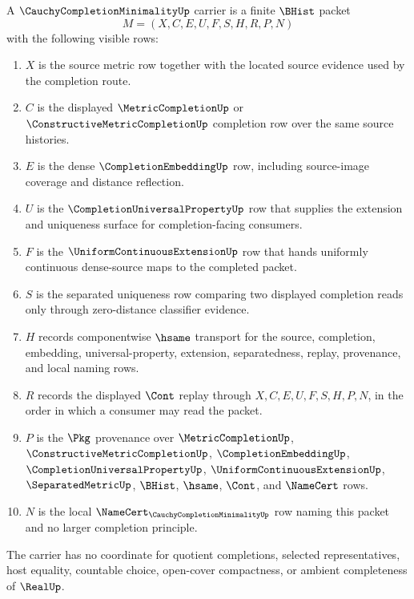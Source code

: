\begin{definition}
\label{def:cauchy-completion-minimality-carrier}
A $\CauchyCompletionMinimalityUp$ carrier is a finite $\BHist$ packet
$$
M=(X,C,E,U,F,S,H,R,P,N)
$$
with the following visible rows:
\begin{enumerate}
\item $X$ is the source metric row together with the located source evidence used by the completion route.
\item $C$ is the displayed $\MetricCompletionUp$ or $\ConstructiveMetricCompletionUp$ completion row over the same source histories.
\item $E$ is the dense $\CompletionEmbeddingUp$ row, including source-image coverage and distance reflection.
\item $U$ is the $\CompletionUniversalPropertyUp$ row that supplies the extension and uniqueness surface for completion-facing consumers.
\item $F$ is the $\UniformContinuousExtensionUp$ row that hands uniformly continuous dense-source maps to the completed packet.
\item $S$ is the separated uniqueness row comparing two displayed completion reads only through zero-distance classifier evidence.
\item $H$ records componentwise $\hsame$ transport for the source, completion, embedding, universal-property, extension, separatedness, replay, provenance, and local naming rows.
\item $R$ records the displayed $\Cont$ replay through $X,C,E,U,F,S,H,P,N$, in the order in which a consumer may read the packet.
\item $P$ is the $\Pkg$ provenance over $\MetricCompletionUp$, $\ConstructiveMetricCompletionUp$, $\CompletionEmbeddingUp$, $\CompletionUniversalPropertyUp$, $\UniformContinuousExtensionUp$, $\SeparatedMetricUp$, $\BHist$, $\hsame$, $\Cont$, and $\NameCert$ rows.
\item $N$ is the local $\NameCert_{\CauchyCompletionMinimalityUp}$ row naming this packet and no larger completion principle.
\end{enumerate}
The carrier has no coordinate for quotient completions, selected representatives, host equality, countable choice, open-cover compactness, or ambient completeness of $\RealUp$.
\end{definition}

